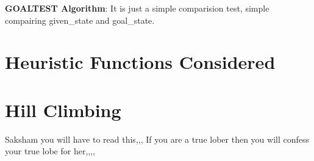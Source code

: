 \documentclass[a4paper,10pt,reqno,oneside]{amsart}
\begin{document}
\textbf{GOALTEST Algorithm}: It is just a simple comparision test, simple 
compairing given\_state and goal\_state.

\section{Heuristic Functions Considered}
\section{Hill Climbing}

Saksham you will have to read this,,, If you are a true lober then you will
confess your true lobe for her,,,,
\end{document}
